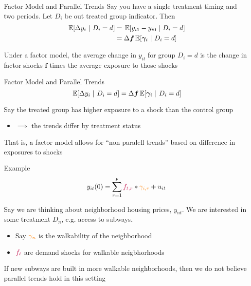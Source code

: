\documentclass[aspectratio=169,t,11pt,table]{beamer}
\begin{document}
\begin{frame}{Factor Model and Parallel Trends}
  Say you have a single treatment timing and two periods. Let $D_i$ be out treated group indicator. Then
  \begin{align*}
    \expec{\Delta y_{i}}{D_i = d} 
    &= \expec{y_{i1} - y_{i0}}{D_i = d} \\ 
    &= \Delta \bm{f} \expec{\bm{\gamma}_i}{D_i = d} 
  \end{align*}
  
  \bigskip
  Under a factor model, the average change in $y_{it}$ for group $D_i = d$ is the change in factor shocks $\bm{f}$ times the average exposure to those shocks 
\end{frame}

\begin{frame}{Factor Model and Parallel Trends}
  \vspace*{-\bigskipamount}
  $$ 
    \expec{\Delta y_{i}}{D_i = d} = \Delta \bm{f} \expec{\bm{\gamma}_i}{D_i = d} 
  $$
  
  Say the treated group has higher exposure to a shock than the control group
  \begin{itemize}
    \item $\implies$ the trends differ by treatment status
  \end{itemize}

  \pause
  \bigskip
  That is, a factor model allows for ``non-paralell trends'' based on difference in exposures to shocks
\end{frame}

\begin{frame}{Example}
  \vspace*{-\bigskipamount}
  $$
    y_{it}(0) = \sum_{r = 1}^{p} {\color{purple}f_{t,r}} * {\color{orange}\gamma_{i,r}} + u_{it}
  $$

  \bigskip
  Say we are thinking about neighborhood housing prices, $y_{nt}$. We are interested in some treatment $D_n$, e.g. access to subways. 
  \begin{itemize}
    \item Say ${\color{orange}\gamma_n}$ is the walkability of the neighborhood
    \item ${\color{purple}f_{t}}$ are demand shocks for walkable neigbhorhoods
  \end{itemize}

  \bigskip
  If new subways are built in more walkable neighborhoods, then we do not believe parallel trends hold in this setting
\end{frame}
\end{document}
